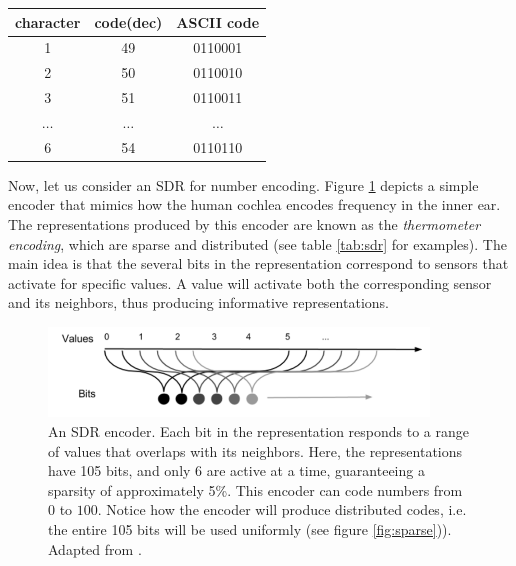 \documentclass{article}
\begin{document}
\begin{center}
 \label{tab:ascci}
 \begin{tabular}{||c c c ||} 
 \hline
 character & code(dec) & ASCII code \\ [0.5ex] 
 \hline\hline
 1 & 49 & 0110001 \\
 \hline
 2 & 50 & 0110010 \\
 \hline
 3 & 51 & 0110011 \\
 \hline
 $\dots$ &  $\dots$ &  $\dots$\\ 
 \hline
 6 & 54 & 0110110 \\ [1ex]
 \hline
\end{tabular}
\end{center}

Now, let us consider an SDR for number encoding. Figure \ref{fig:SDR_number_encoder} depicts a simple encoder that mimics how the human cochlea encodes frequency in the inner ear. The representations produced by this encoder are known as the \textit{thermometer encoding},  which are sparse and distributed (see table \ref{tab:sdr} for examples). The main idea is that the several bits in the representation correspond to sensors that activate for specific values. A value will activate both the corresponding sensor and its neighbors, thus producing informative representations. 

\begin{figure}[h]
    \centering
    \includegraphics[width=0.9\textwidth]{img/SDR_number_encoder.PNG}
    \caption{An SDR encoder. Each bit in the representation responds to a range of values that overlaps with its neighbors. Here, the representations have 105 bits, and only 6 are active at a time, guaranteeing a sparsity of approximately 5\%. This encoder can code numbers from $0$ to $100$. Notice how the encoder will produce distributed codes, i.e. the entire 105 bits will be used uniformly (see figure \ref{fig:sparse})). Adapted from \cite{Hawkins-et-al-2016-Book}.}
\label{fig:SDR_number_encoder}
\end{figure}
\end{document}
